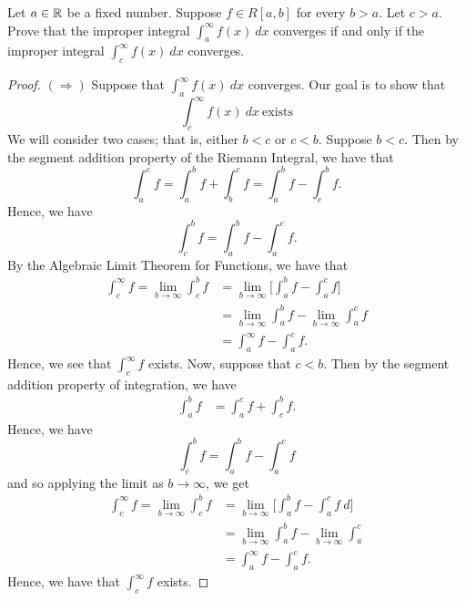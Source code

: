 \documentclass[a4paper]{article}
\begin{document}
\begin{problem}
    Let \( a \in \mathbb{R}  \) be a fixed number. Suppose \( f \in R[a,b] \) for every \( b > a  \). Let \( c > a  \). Prove that the improper integral \( \int_{ a }^{ \infty  } f(x) \ dx  \) converges if and only if the improper integral \( \int_{ c }^{ \infty  } f(x) \ dx   \) converges.
\end{problem}
\begin{proof}
\( (\Longrightarrow) \) Suppose that \( \int_{ a }^{ \infty  } f(x) \ dx   \) converges. Our goal is to show that 
\[  \int_{ c }^{ \infty  } f(x)  \ dx \ \text{exists} \]
We will consider two cases; that is, either \( b < c  \) or \( c < b   \).
Suppose \( b < c  \). Then by the segment addition property of the Riemann Integral, we have that 
\[  \int_{ a }^{ c } f  = \int_{ a }^{ b } f  + \int_{ b }^{ c }  f = \int_{ a }^{ b } f   - \int_{ c }^{ b } f. \]
Hence, we have 
\[  \int_{ c }^{ b } f = \int_{ a }^{ b } f - \int_{ a }^{ c } f. \]
By the Algebraic Limit Theorem for Functions, we have that 
\begin{align*}
\int_{ c  }^{ \infty  }  f   = \lim_{ b \to \infty  } \int_{ c }^{ b } f  &= \lim_{ b \to \infty  }  \Big[ \int_{ a }^{ b }  f   - \int_{ a }^{ c }  f  \Big] \\ 
                                                                          &= \lim_{ b \to \infty  }  \int_{ a }^{ b } f  - \lim_{ b \to \infty  } \int_{ a }^{ c } f \tag{ALT for Functions}  \\
                                           &= \int_{ a }^{ \infty  } f   - \int_{ a }^{ c } f.
\end{align*}
Hence, we see that \( \int_{ c }^{ \infty  } f     \) exists. Now, suppose that \( c < b  \). Then by the segment addition property of integration, we have 
   \begin{align*}
      \int_{ a }^{ b } f  &= \int_{ a }^{ c } f + \int_{ c }^{ b } f.
   \end{align*} 
   Hence, we have 
   \[  \int_{ c }^{ b } f  = \int_{ a }^{ b } f  - \int_{ a }^{ c } f \]
   and so applying the limit as \( b \to \infty  \), we get 
   \begin{align*}
       \int_{ c  }^{ \infty  } f  = \lim_{ b \to \infty  }  \int_{ c }^{ b }  f   &= \lim_{ b \to \infty  } \Big[  \int_{ a }^{ b } f  - \int_{ a }^{ c  }  f  \ d \Big]  \\
                                                                                  &= \lim_{ b \to \infty  } \int_{ a }^{ b } f  - \lim_{ b \to \infty  }  \int_{ a }^{ c } \tag{ALT for Functions}  \\
                                                     &= \int_{ a }^{ \infty  } f  - \int_{ a }^{ c  } f.
   \end{align*}
   Hence, we have that \( \int_{ c }^{ \infty  } f \) exists.
    

\end{proof}
\end{document}
